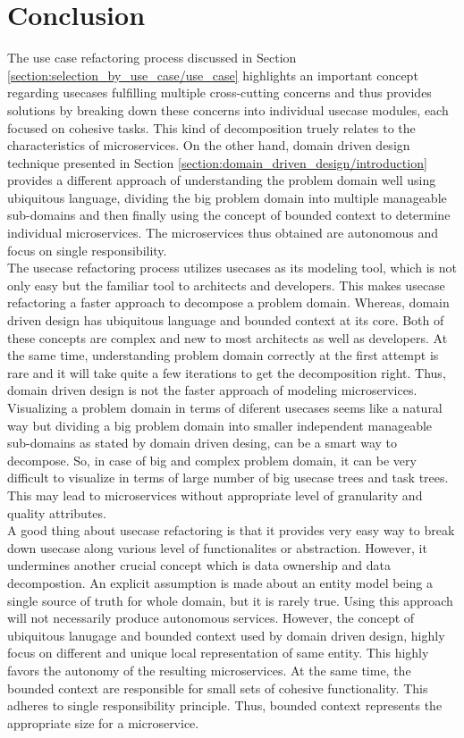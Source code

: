 \section{Conclusion}\label{section:modeling_microservices/conclusion}
The use case refactoring process discussed in Section \ref{section:selection_by_use_case/use_case} highlights an important concept regarding usecases fulfilling multiple cross-cutting concerns and thus provides solutions by breaking down these concerns into individual usecase modules, each focused on cohesive tasks. This kind of decomposition truely relates to the characteristics of microservices. On the other hand, domain driven design technique presented in Section \ref{section:domain_driven_design/introduction} provides a different approach of understanding the problem domain well using ubiquitous language, dividing the big problem domain into multiple manageable sub-domains and then finally using the concept of bounded context to determine individual microservices. The microservices thus obtained are autonomous and focus on single responsibility.\\
The usecase refactoring process utilizes usecases as its modeling tool, which is not only easy but the familiar tool to architects and developers. This makes usecase refactoring a faster approach to decompose a problem domain. Whereas, domain driven design has ubiquitous language and bounded context at its core. Both of these concepts are complex and new to most architects as well as developers. At the same time, understanding problem domain correctly at the first attempt is rare and it will take quite a few iterations to get the decomposition right. Thus, domain driven design is not the faster approach of modeling microservices.\\
Visualizing a problem domain in terms of diferent usecases seems like a natural way but dividing a big problem domain into smaller independent manageable sub-domains as stated by domain driven desing, can be a smart way to decompose. So, in case of big and complex problem domain, it can be very difficult to visualize in terms of large number of big usecase trees and task trees. This may lead to microservices without appropriate level of granularity and quality attributes.\\
A good thing about usecase refactoring is that it provides very easy way to break down usecase along various level of functionalites or abstraction. However, it undermines another crucial concept which is data ownership and data decompostion. An explicit assumption is made about an entity model being a single source of truth for whole domain, but it is rarely true. Using this approach will not necessarily produce autonomous services. However, the concept of ubiquitous lanugage and bounded context used by domain driven design, highly focus on different and unique local representation of same entity. This highly favors the autonomy of the resulting microservices. At the same time, the bounded context are responsible for small sets of cohesive functionality. This adheres to single responsibility principle. Thus, bounded context represents the appropriate size for a microservice.

